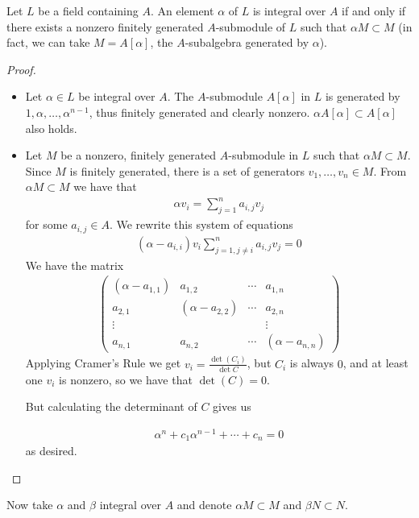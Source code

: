 \begin{thmbox}
    \begin{proposition}
        Let \(L\) be a field containing \(A\). An element \(\alpha\) of \(L\) is integral over \(A\) if and only if there exists a nonzero finitely generated \(A\)-submodule of \(L\) such that \(\alpha M \subset M\) (in fact, we can take \(M = A[\alpha]\), the \(A\)-subalgebra generated by \(\alpha\)).
    \end{proposition}
\end{thmbox}
\begin{proof}
    \begin{itemize}
        \item Let \(\alpha \in L\) be integral over \(A\). The \(A\)-submodule \(A[\alpha]\) in \(L\) is generated by \(1, \alpha, \ldots, \alpha^{n-1}\), thus finitely generated and clearly nonzero. \(\alpha A[\alpha] \subset A[\alpha]\) also holds.
        \item Let \(M\) be a nonzero, finitely generated \(A\)-submodule in \(L\) such that \(\alpha M \subset M\). Since \(M\) is finitely generated, there is a set of generators \(v_1, \ldots, v_n \in M\). From \(\alpha M \subset M\) we have that
        \begin{align*}
            \alpha v_i = \sum_{j = 1}^n a_{i, j} v_j
        \end{align*}
        for some \(a_{i, j} \in A\). We rewrite this system of equations
        \begin{align*}
            (\alpha - a_{i, i}) v_i \sum_{j = 1, j \neq i}^n a_{i, j} v_j = 0
        \end{align*}
        We have the matrix
        \begin{align*}
            \begin{pmatrix}
                (\alpha - a_{1, 1}) & a_{1, 2} & \cdots & a_{1, n}\\
                a_{2,1} & (\alpha - a_{2, 2}) & \cdots & a_{2, n} \\
                \vdots & & & \vdots \\
                a_{n, 1} & a_{n, 2} & \cdots & (\alpha - a_{n,n})
            \end{pmatrix}
        \end{align*}
        Applying Cramer's Rule we get \(v_i = \frac{\det(C_i)}{\det{C}}\), but \(C_i\) is always \(0\), and at least one \(v_i\) is nonzero, so we have that \(\det(C) = 0\).

        But calculating the determinant of \(C\) gives us

        \begin{align*}
            \alpha^n + c_1 \alpha^{n-1} + \cdots + c_n = 0
        \end{align*}
        as desired.
    \end{itemize}
\end{proof}
Now take \(\alpha\) and \(\beta\) integral over \(A\) and denote \(\alpha M \subset M\) and \(\beta N \subset N\).

